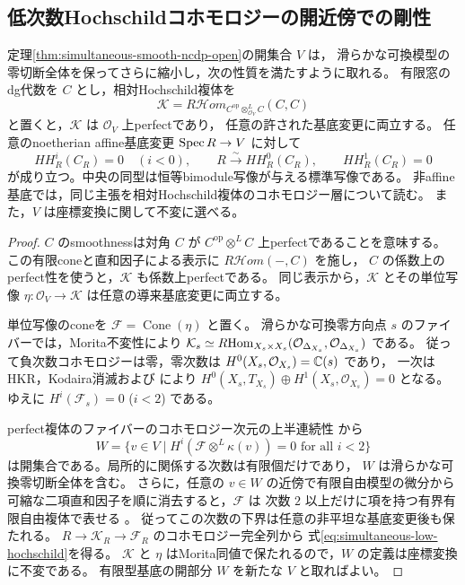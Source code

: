 \subsection{低次数Hochschildコホモロジーの開近傍での剛性}

\begin{proposition}\label{prop:simultaneous-hochschild-rigid-open}
定理\ref{thm:simultaneous-smooth-ncdp-open}の開集合 $V$ は，
滑らかな可換模型の零切断全体を保ってさらに縮小し，次の性質を満たすように取れる。
有限窓のdg代数を $C$ とし，相対Hochschild複体を
\[
 \mathcal K=R\!\mathcal Hom_{C^{\mathrm{op}}\otimes^L_{\mathcal O_V}C}(C,C)
\]
と置くと，$\mathcal K$ は $\mathcal O_V$ 上perfectであり，
任意の許された基底変更に両立する。
任意のnoetherian affine基底変更 $\operatorname{Spec} R\to V$ に対して
\begin{equation}\label{eq:simultaneous-low-hochschild}
 HH_R^i(C_R)=0\quad(i<0),\qquad
 R\xrightarrow{\sim}HH_R^0(C_R),\qquad HH_R^1(C_R)=0
\end{equation}
が成り立つ。中央の同型は恒等bimodule写像が与える標準写像である。
非affine基底では，同じ主張を相対Hochschild複体のコホモロジー層について読む。
また，$V$ は座標変換に関して不変に選べる。
\end{proposition}
\begin{proof}
$C$ のsmoothnessは対角 $C$ が $C^{\mathrm{op}}\otimes^LC$ 上perfectであることを意味する。
この有限coneと直和因子による表示に $R\!\mathcal Hom(-,C)$ を施し，
$C$ の係数上のperfect性を使うと，$\mathcal K$ も係数上perfectである。
同じ表示から，$\mathcal K$ とその単位写像
$\eta:\mathcal O_V\to\mathcal K$ は任意の導来基底変更に両立する。

単位写像のconeを $\mathcal F=\operatorname{Cone}(\eta)$ と置く。
滑らかな可換零方向点 $s$ のファイバーでは，Morita不変性により
$\mathcal K_s\simeq R\!\operatorname{Hom}_{X_s\times X_s}
(\mathcal O_{\Delta_{X_s}},\mathcal O_{\Delta_{X_s}})$ である。
従って負次数コホモロジーは零，零次数は $H^0(X_s,\mathcal O_{X_s})=\mathbb C(s)$ であり，
一次はHKR，Kodaira消滅および \cite[補題8.7]{PoissonDP} により
$H^0(X_s,T_{X_s})\oplus H^1(X_s,\mathcal O_{X_s})=0$ となる。
ゆえに $H^i(\mathcal F_s)=0$ ($i<2$) である。

perfect複体のファイバーのコホモロジー次元の上半連続性
\cite[Tag 0BDI]{StacksProject}から
\[
 W=\{v\in V\mid H^i(\mathcal F\otimes^L\kappa(v))=0
                 \text{ for all }i<2\}
\]
は開集合である。局所的に関係する次数は有限個だけであり，
$W$ は滑らかな可換零切断全体を含む。
さらに，任意の $v\in W$ の近傍で有限自由模型の微分から
可縮な二項直和因子を順に消去すると，$\mathcal F$ は
次数 $2$ 以上だけに項を持つ有界有限自由複体で表せる
\cite[Tag 0BCD]{StacksProject}。
従ってこの次数の下界は任意の非平坦な基底変更後も保たれる。
$R\to\mathcal K_R\to\mathcal F_R$ のコホモロジー完全列から
式\eqref{eq:simultaneous-low-hochschild}を得る。
$\mathcal K$ と $\eta$ はMorita同値で保たれるので，$W$ の定義は座標変換に不変である。
有限型基底の開部分 $W$ を新たな $V$ と取ればよい。
\end{proof}

